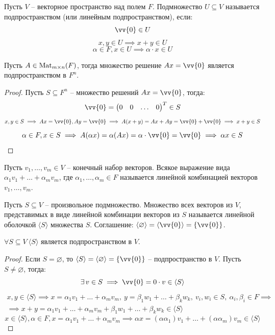 \documentclass[12pt]{article}
\begin{document}
\begin{definition}
	Пусть $V$ -- векторное пространство над полем $F$. Подмножество
	$U\subseteq V$ называется подпространством (или линейным
	подпространством), если:
	\[\vv{0}\in U\]
	\[x, y\in U\implies x+y\in U\]
	\[\alpha\in F, x\in U\implies \alpha\cdot x\in U\]
\end{definition}
\begin{statement}
	Пусть $A\in\operatorname{Mat}_{m\times n}(F)$, тогда множество решение $Ax=\vv{0}$
	является подпространством в $F^n$.
	\begin{proof}
		Пусть $S\subseteq F^n$ -- множество решений $Ax=\vv{0}$, тогда:
		\[\vv{0}=
			\begin{pmatrix}
				0 & 0 & \ldots & 0
		\end{pmatrix}^T\in S\]
		\[x,y\in S\implies Ax=\vv{0}, Ay=\vv{0}\implies
		A(x+y)=Ax+Ay=\vv{0}+\vv{0}\implies x+y\in S\]
		\[\alpha\in F,x\in S\implies A(\alpha
		x)=\alpha(Ax)=\alpha\cdot\vv{0}=\vv{0}\implies \alpha x\in S\]
	\end{proof}
\end{statement}
\begin{definition}
	Пусть $v_1,\ldots,v_m\in V$ -- конечный набор векторов. Всякое
	выражение вида $\alpha_1v_1+\ldots+\alpha_mv_m$, где
	$\alpha_1,\ldots,\alpha_m\in F$ называется линейной комбинацией
	векторов $v_1,\ldots,v_m$.
\end{definition}
\begin{definition}
	Пусть $S\subseteq V$ -- произвольное подмножество. Множество всех
	векторов из $V$, представимых в виде линейной комбинации векторов из
	$S$ называется линейной оболочкой $\langle S\rangle$ множества $S$.
	Соглашение: $\langle\varnothing\rangle=\langle\vv{0}\rangle=\{\vv{0}\}$.
\end{definition}
\begin{statement} $\forall S\subseteq V\ \langle S\rangle$ является
	подпространством в $V$.
	\begin{proof}
		Если $S=\varnothing$, то $\langle S\rangle=\langle
		\varnothing\rangle=\{\vv{0}\}$ -- подпространство в $V$. Пусть
		$S\neq\varnothing$, тогда:
		\[\exists\,v\in S\implies \vv{0}=0\cdot v\in\langle S\rangle\]
		\begin{multline*}
			x, y\in\langle S\rangle \implies
			x=\alpha_1v_1+\ldots+\alpha_mv_m,\ y=\beta_1w_1+\ldots+\beta_kw_k,\ v_i,w_i\in
			S,\ \alpha_i,\beta_i\in F\implies\\
			\implies
			x+y=\alpha_1v_1+\ldots+\alpha_mv_m+\beta_1w_1+\ldots+\beta_kw_k\in
			\langle S\rangle
		\end{multline*}
		\[x\in\langle S\rangle, \alpha\in F,
			x=\alpha_1v_1+\ldots+\alpha_mv_m\implies \alpha
		x=(\alpha\alpha_1)v_1+\ldots+(\alpha\alpha_m)v_m\in\langle S\rangle\]
	\end{proof}
\end{statement}
\end{document}
